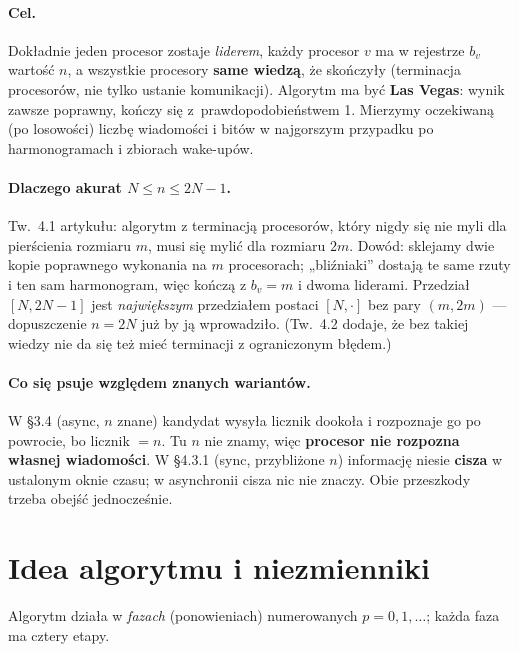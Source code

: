 \documentclass[11pt,a4paper]{article}
\theoremstyle{definition}
\begin{document}
\paragraph{Cel.} Dokładnie jeden procesor zostaje \emph{liderem}, każdy procesor $v$ ma w rejestrze
$b_v$ wartość $n$, a wszystkie procesory \textbf{same wiedzą}, że skończyły (terminacja procesorów, nie tylko
ustanie komunikacji). Algorytm ma być \textbf{Las Vegas}: wynik zawsze poprawny, kończy się
z~prawdopodobieństwem 1. Mierzymy oczekiwaną (po losowości) liczbę wiadomości i bitów w najgorszym
przypadku po harmonogramach i zbiorach wake-upów.

\paragraph{Dlaczego akurat $N\le n\le 2N-1$.} Tw.\ 4.1 artykułu: algorytm z terminacją procesorów,
który nigdy się nie myli dla pierścienia rozmiaru $m$, musi się mylić dla rozmiaru $2m$. Dowód: sklejamy
dwie kopie poprawnego wykonania na $m$ procesorach; „bliźniaki” dostają te same rzuty i ten sam
harmonogram, więc kończą z $b_v=m$ i dwoma liderami. Przedział $[N,2N-1]$ jest \emph{największym}
przedziałem postaci $[N,\cdot]$ bez pary $(m,2m)$ — dopuszczenie $n=2N$ już by ją wprowadziło.
(Tw.\ 4.2 dodaje, że bez takiej wiedzy nie da się też mieć terminacji z ograniczonym błędem.)

\paragraph{Co się psuje względem znanych wariantów.} W §3.4 (async, $n$ znane) kandydat wysyła licznik
dookoła i rozpoznaje go po powrocie, bo licznik $=n$. Tu $n$ nie znamy, więc
\textbf{procesor nie rozpozna własnej wiadomości}. W §4.3.1 (sync, przybliżone $n$) informację niesie
\textbf{cisza} w ustalonym oknie czasu; w asynchronii cisza nic nie znaczy. Obie przeszkody trzeba
obejść jednocześnie.

\section{Idea algorytmu i niezmienniki}

Algorytm działa w \emph{fazach} (ponowieniach) numerowanych $p=0,1,\dots$; każda faza ma cztery etapy.
\end{document}
